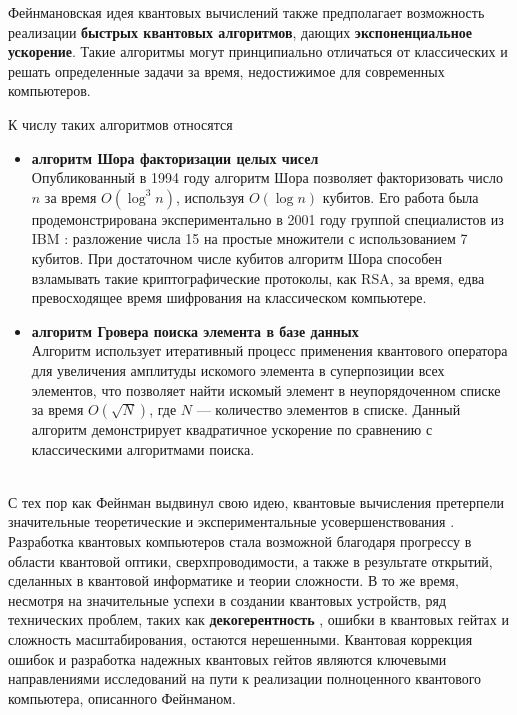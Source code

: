 Фейнмановская идея квантовых вычислений также предполагает возмож­ность реализации \textbf{быстрых квантовых алгоритмов}, дающих \textbf{экспоненци­альное ускорение}. Такие алгоритмы могут принципиально отличаться от классических и решать определенные задачи за время, недостижимое для со­временных компьютеров.

\clearpage
К числу таких алгоритмов относятся
\begin{itemize}
\item{
	\textbf{алгоритм Шора факторизации целых чисел \cite{shor}}\\
	Опубликованный в 1994 году алгоритм Шора позволяет факторизовать число $n$ за время $O(\log^{3}n)$, используя $O(\log n)$ кубитов. Его работа была продемонстрирована экспериментально в 2001 году группой спе­циалистов из IBM \cite{shor_exp}: разложение числа 15 на простые множители с использованием 7 кубитов. При достаточном числе кубитов алгоритм Шора способен взламывать такие криптографические протоколы, как RSA, за время, едва превосходящее время шифрования на классическом компьютере.\\[-12pt]
}
\item{
	\textbf{алгоритм Гровера поиска элемента в базе данных \cite{grover}}\\
	Алгоритм использует итеративный процесс применения квантового опе­ратора для увеличения амплитуды искомого элемента в суперпозиции всех элементов, что позволяет найти искомый элемент в неупорядочен­ном списке за время $O(\sqrt{N})$, где $N$ --- количество элементов в списке. Данный алгоритм демонстрирует квадратичное ускорение по сравне­нию с классическими алгоритмами поиска.
}
\end{itemize}
\
\\[-6pt]
\indent С тех пор как Фейнман выдвинул свою идею, квантовые вычисления претерпели значительные теоретические и экспериментальные усовершенство­вания \cite{quantum_computing_strengths_weaknesses,kitaev,quantum_computing_zalka,quantum_computing_universal,decoherence_fedichkin,valiev_1,valiev_2,stean,quantum_computing_abrams_lloyd,quantum_computing_ablayev}. Разработка квантовых компьютеров стала возможной благодаря прогрессу в области квантовой оптики, сверхпроводимости, а также в результате открытий, сделанных в квантовой информатике и теории сложности. В то же время, несмотря на значительные успехи в создании кван­товых устройств, ряд технических проблем, таких как \textbf{декогерентность} \cite{decoherence_fedichkin,breuer}, ошибки в квантовых гейтах и сложность масштабирования, остаются нерешенными. Квантовая коррекция ошибок \cite{shor_error_1,shor_error_2,shor_error_3} и разработка надежных квантовых гейтов \cite{fault_tolerant_1,fault_tolerant_2} являются ключевыми направлениями исследований на пути к реализации полноценного квантового компьютера, описанного Фейнманом.

